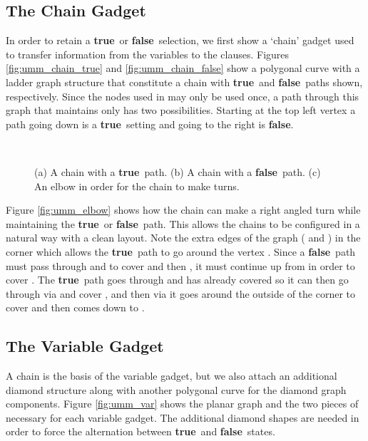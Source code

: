 \documentclass{article}[11pt]
\newcommand{\true}{\textbf{true}}
\newcommand{\false}{\textbf{false}}
\begin{document}
\subsection{The Chain Gadget}
In order to retain a \true\ or \false\ selection, we first show a `chain' gadget used to transfer information
from the variables to the clauses. 
Figures \ref{fig:umm_chain_true} and \ref{fig:umm_chain_false} show a polygonal curve with a ladder graph structure
that constitute a chain with \true\ and \false\ paths shown, respectively.  
Since the nodes used in  may only be used once, a path through this graph that maintains
 only has two possibilities.  Starting at the top
left vertex a path going down is a \true\ setting and going to the right is \false.



\begin{figure}[ht!]
\begin{center}
        \hspace*{.2cm}
        \hspace*{.2cm}
         \\
    \end{center}
\caption{(a) A chain with a \true\ path. (b) A chain with a \false\ path. (c) An elbow in order for the chain to make turns.}
    \label{fig:umm_temp}
\end{figure} 




Figure \ref{fig:umm_elbow} shows how the chain can make a right angled turn 
while maintaining the \true\ or \false\ path.  This allows the chains to be configured in a natural way with a 
clean layout. Note the extra edges of the graph ( and ) in the corner which allows
the \true\ path to go around the vertex . Since a \false\ path must pass through
 and  to cover  and then , it must continue up from  in order to cover . 
The \true\ path goes through  and has already covered  so it can then go 
through  via  and cover , and then via  it goes around the
outside of the corner to cover  and then comes down to . 





\subsection{The Variable Gadget}
A chain is the basis of the variable gadget, but we also attach an additional 
diamond structure along with another polygonal curve for the diamond graph components.
Figure \ref{fig:umm_var} shows the planar graph and the two pieces of  
necessary for each variable gadget.   
The additional diamond shapes are needed in order to force the
alternation between \true\ and \false\ states.  
\end{document}

